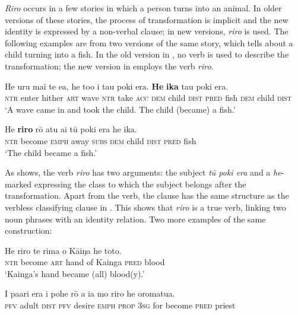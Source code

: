 \textit{Riro} occurs in a few stories in which a person turns into an animal. In older versions of these stories, the process of transformation is implicit and the new identity is expressed by a non-verbal clause; in new versions, \textit{riro} is used. The following examples are from two versions of the same story, which tells about a child turning into a fish. In the old version in , no verb is used to describe the transformation; the new version in  employs the verb \textit{riro}.

\ea\label{ex:9.106}
\gll He uru mai te e{\ꞌ}a, he to{\ꞌ}o i tau poki era. \textbf{He} \textbf{ika} tau poki era. \\
\textsc{ntr} enter hither \textsc{art} wave \textsc{ntr} take \textsc{acc} \textsc{dem} child \textsc{dist} \textsc{pred} fish \textsc{dem} child \textsc{dist} \\

\glt 
‘A wave came in and took the child. The child (became) a fish.’ \textstyleExampleref{[Mtx-7-10.019]}
\z

\ea\label{ex:9.107}
\gll He \textbf{riro} rō atu {\ꞌ}ai tū poki era he ika. \\
\textsc{ntr} become \textsc{emph} away \textsc{subs} \textsc{dem} child \textsc{dist} \textsc{pred} fish \\

\glt
‘The child became a fish.’ \textstyleExampleref{[R338.006]} 
\z

As  shows, the verb \textit{riro} has two arguments: the subject \textit{tū poki era} and a \textit{he}-marked  expressing the class to which the subject belongs after the transformation. Apart from the verb, the clause has the same structure as the verbless classifying clause in . This shows that \textit{riro} is a true  verb, linking two noun phrases with an identity relation. Two more examples of the same construction:

\ea\label{ex:9.108}
\gll He riro te rima o Kāiŋa he toto. \\
\textsc{ntr} become \textsc{art} hand of Kainga \textsc{pred} blood \\

\glt 
‘Kainga’s hand became (all) blood(y).’ \textstyleExampleref{[R243.074]} 
\z

\ea\label{ex:9.109}
\gll I pa{\ꞌ}ari era i pohe rō a ia mo riro he oromatu{\ꞌ}a. \\
\textsc{pfv} adult \textsc{dist} \textsc{pfv} desire \textsc{emph} \textsc{prop} \textsc{3sg} for become \textsc{pred} priest \\

